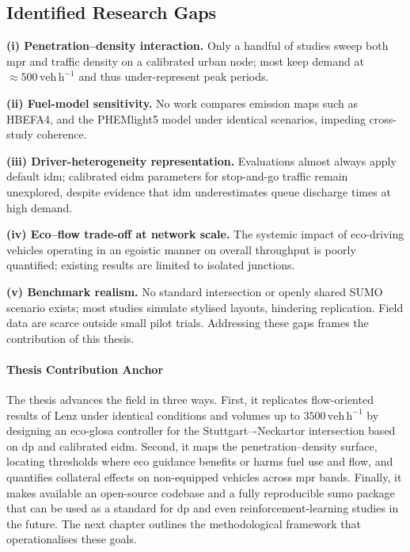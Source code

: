 \subsection{Identified Research Gaps}
\textbf{(i) Penetration–density interaction.}  Only a handful of studies sweep both \ac{mpr} and traffic density on a calibrated urban node; most keep demand at \(\approx500\,\mathrm{veh\,h^{-1}}\) and thus under-represent peak periods.  \par
\textbf{(ii) Fuel-model sensitivity.}  No work compares emission maps such as HBEFA4, and the PHEMlight5 model under identical scenarios, impeding cross-study coherence.  \par
\textbf{(iii) Driver-heterogeneity representation.}  Evaluations almost always apply default \ac{idm}; calibrated \ac{eidm} parameters for stop-and-go traffic remain unexplored, despite evidence that \ac{idm} underestimates queue discharge times at high demand.  \par
\textbf{(iv) Eco–flow trade-off at network scale.}  The systemic impact of eco-driving vehicles operating in an egoistic manner on overall throughput is poorly quantified; existing results are limited to isolated junctions.  \par
\textbf{(v) Benchmark realism.}  No standard intersection or openly shared SUMO scenario exists; most studies simulate stylised layouts, hindering replication. Field data are scarce outside small pilot trials.
\mynewline
Addressing these gaps frames the contribution of this thesis.

\paragraph{Thesis Contribution Anchor}
The thesis advances the field in three ways. First, it replicates flow-oriented results of Lenz \cite{Lenz2024} under identical conditions and volumes up to \(3500\,\mathrm{veh\,h^{-1}}\) by designing an \ac{eco-glosa} controller for the Stuttgart–-Neckartor intersection based on \ac{dp} and calibrated \ac{eidm}. Second, it maps the penetration–density surface, locating thresholds where eco guidance benefits or harms fuel use and flow, and quantifies collateral effects on non-equipped vehicles across \ac{mpr} bands. Finally, it makes available an open-source codebase and a fully reproducible \ac{sumo} package that can be used as a standard for \ac{dp} and even reinforcement-learning studies in the future.
\mynewline
The next chapter outlines the methodological framework that operationalises these goals.